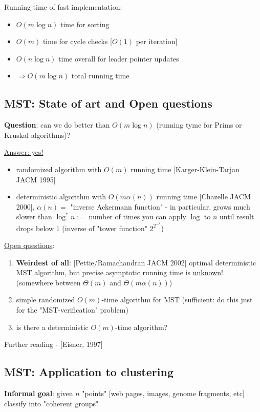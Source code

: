 \documentclass[a4paper,12pt]{article}
\theoremstyle{plain}
\theoremstyle{definition}
\theoremstyle{remark}
\begin{document}
Running time of fast implementation:
\begin{itemize}
	\item $O(m \log n)$ time for sorting
	\item $O(m)$ time for cycle checks [$O(1)$ per iteration]
	\item $O(n \log n)$ time overall for leader pointer updates
	\item $\Rightarrow O(m \log n)$ total running time
\end{itemize}



\subsection{MST: State of art and Open questions}
\textbf{Question}: can we do better than $O(m \log n)$ (running tyme for Prims or Kruskal algorithms)?

\underline{Answer: yes!}
\begin{itemize}
	\item randomized algorithm with $O(m)$ running time [Karger-Klein-Tarjan JACM 1995]
	\item deterministic algorithm with $O(m \alpha(n))$ running time [Chazelle JACM 2000], $\alpha(n) =$ "inverse Ackermann function" - in particular, grows much slower than $\log^* n :=$ number of times you can apply $\log$ to $n$ until result drops below $1$ (inverse of "tower function" $2^{2^{...^{2}}}$)
\end{itemize}

\underline{Open questions}:
\begin{enumerate}
	\item \textbf{Weirdest of all}: [Pettie/Ramachandran JACM 2002] optimal deterministic MST algorithm, but precise asymptotic running time is \underline{unknown}! (somewhere between $\Theta(m)$ and $\Theta(m \alpha(n))$)
	\item simple randomized $O(m)$-time algorithm for MST (sufficient: do this just for the "MST-verification" problem)
	\item is there a deterministic $O(m)$-time algorithm?
\end{enumerate}

Further reading - [Eisner, 1997]



\subsection{MST: Application to clustering}
\textbf{Informal goal}: given $n$ "points" [web pages, images, genome fragments, etc] classify into "coherent groups"
\\
\end{document}
